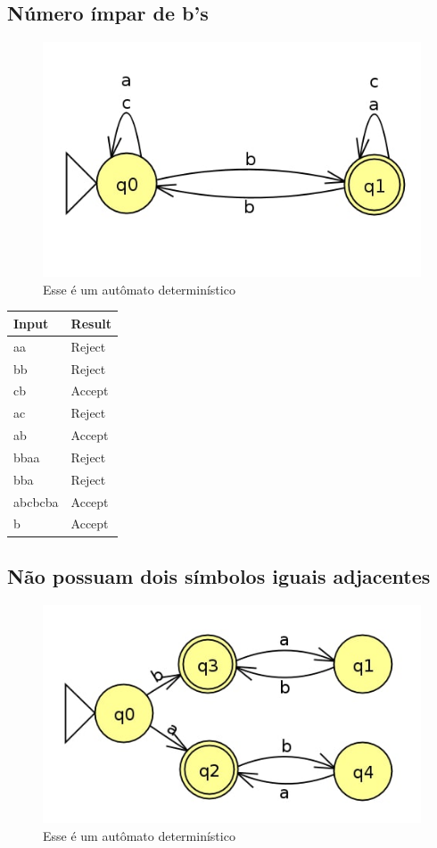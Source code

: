 \documentclass[11pt]{article}
\begin{document}
\pagebreak
\subsection{Número ímpar de b’s}
\label{sec:org334c150}
\begin{figure}[htbp]
\centering
\includegraphics[width=.9\linewidth]{./q1/g/q1g.jpg}
\caption{\label{fig:org841d2b6}
Esse é um autômato determinístico}
\end{figure}

\begin{center}
\begin{tabular}{ll}
Input & Result\\
\hline
aa & Reject\\
bb & Reject\\
cb & Accept\\
ac & Reject\\
ab & Accept\\
bbaa & Reject\\
bba & Reject\\
abcbcba & Accept\\
b & Accept\\
\end{tabular}
\end{center}
\pagebreak
\subsection{Não possuam dois símbolos iguais adjacentes}
\label{sec:orgac60c58}
\begin{figure}[htbp]
\centering
\includegraphics[width=.9\linewidth]{./q1/h/q1h.jpg}
\caption{\label{fig:org419664d}
Esse é um autômato determinístico}
\end{figure}
\end{document}
